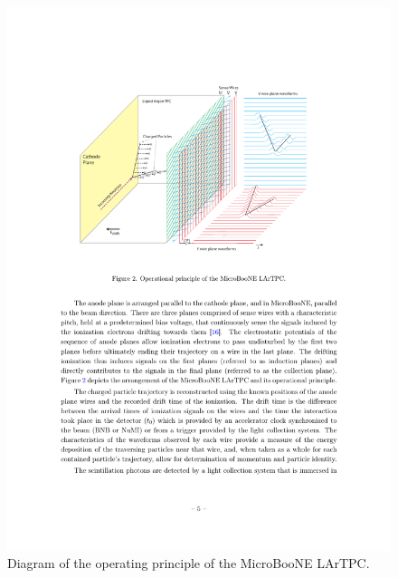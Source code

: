 \begin{figure}
    \centering
    \includegraphics[width=0.7\linewidth]{figures/lartpc_diagram.pdf}
    \caption{Diagram of the operating principle of the MicroBooNE LArTPC.}
    \label{fig:lartpc_diagram}
\end{figure}

